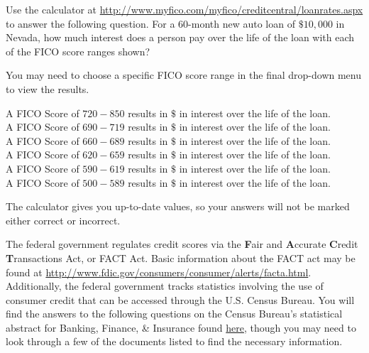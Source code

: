 \documentclass{ximera}
\begin{document}
\begin{question}
Use the calculator at \href{http://www.myfico.com/myfico/creditcentral/loanrates.aspx}{http://www.myfico.com/myfico/creditcentral/loanrates.aspx} to answer the following question. For a 60-month new auto loan of $\$10,000$ in Nevada, how much interest does a person pay over the life of the loan with each of the FICO score ranges shown?
\begin{hint}
You may need to choose a specific FICO score range in the final drop-down menu to view the results.
\end{hint}

A FICO Score of $720-850$ results in $\$$\answer{} in interest over the life of the loan.\\
A FICO Score of $690-719$ results in $\$$\answer{} in interest over the life of the loan.\\
A FICO Score of $660-689$ results in $\$$\answer{} in interest over the life of the loan.\\
A FICO Score of $620-659$ results in $\$$\answer{} in interest over the life of the loan.\\
A FICO Score of $590-619$ results in $\$$\answer{} in interest over the life of the loan.\\
A FICO Score of $500-589$ results in $\$$\answer{} in interest over the life of the loan.\\

\begin{hint}
The calculator gives you up-to-date values, so your answers will not be marked either correct or incorrect.
\end{hint}

\end{question}

The federal government regulates credit scores via the \textbf{F}air and \textbf{A}ccurate \textbf{C}redit \textbf{T}ransactions Act, or FACT Act. Basic information about the FACT act may be found at \href{http://www.fdic.gov/consumers/consumer/alerts/facta.html}{http://www.fdic.gov/consumers/consumer/alerts/facta.html}. Additionally, the federal government tracks statistics involving the use of consumer credit that can be accessed through the U.S. Census Bureau. You will find the answers to the following questions on the Census Bureau's statistical abstract for Banking, Finance, \& Insurance found \href{http://www.census.gov/compendia/statab/cats/banking_finance_insurance/payment_systems_consumer_credit_mortgage_debt.html}{here}, though you may need to look through a few of the documents listed to find the necessary information.
\end{document}

